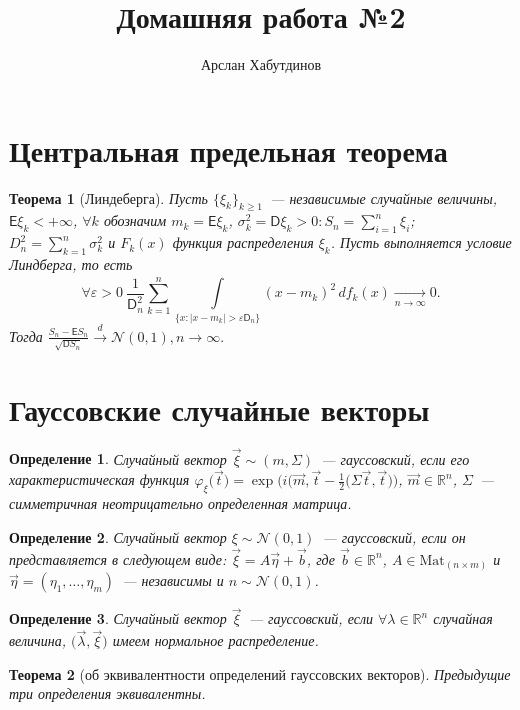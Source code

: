 \documentclass[11pt]{article}
\title{Домашняя работа №2}
\author{Арслан Хабутдинов}
\date{}
\newtheorem{thm}{Теорема}[section]
\newtheorem{dfn}{Определение}
\begin{document}
    \maketitle
    \section{Центральная предельная теорема}
    \begin{thm}[Линдеберга]
        Пусть $\{\xi_k\}_{k \geq 1}$~--- независимые случайные величины, $\mathsf{E}\xi_k < +\infty$, $\forall k$ обозначим $m_k = \mathsf{E}\xi_k$, $\sigma_k^2 = \mathsf{D}\xi_k > 0:S_n = \sum\limits_{i = 1}^n\xi_i$; $D_n^2 = \sum\limits_{k = 1}^n\sigma_k^2$ и $F_k(x)$ функция распределения $\xi_k$. Пусть выполняется условие Линдберга, то есть 
        $$
        \forall\varepsilon > 0~\frac{1}{\mathsf{D}_n^2} \sum\limits_{k = 1}^n \int\limits_{\{x:|x - m_k| > \varepsilon \mathsf{D}_n\}}^{} (x - m_k)^2  \,d f_k(x) \xrightarrow[n\rightarrow\infty]{}0.
        $$
        Тогда $\frac{S_n - \mathsf{E}S_n}{\sqrt{\mathsf{D}S_n}} \xrightarrow{d} \mathcal{N}(0,1), n \rightarrow \infty.$
    \end{thm}

    \section{Гауссовские случайные векторы}
    \begin{dfn}
        Случайный вектор $\vec \xi \sim (m, \Sigma)$~--- гауссовский, если его характеристическая функция $\varphi_\xi\bigl(\vec t\bigr) = \exp{\bigl(i\bigl(\vec m, \vec t} - \frac{1}{2}\bigl(\Sigma \vec t, \vec t\bigr)\bigr)$, $\vec m \in \mathbb{R}^n$, $\Sigma$~--- симметричная неотрицательно определенная  матрица.
    \end{dfn}
    \begin{dfn}
        Случайный вектор $\xi \sim \mathcal{N}(0,1)$~--- гауссовский, если он представляется в следующем виде: $\vec \xi = A\vec \eta + \vec b$, где  $\vec b \in \mathbb{R}^n$, $A \in \text{Mat}_{(n \times m)}$ и $\vec \eta = (\eta_1, \dots, \eta_m)$~--- независимы и $n \sim \mathcal{N}(0,1)$.
    \end{dfn}
    \begin{dfn}
        Случайный вектор $\vec \xi$~--- гауссовский, если  $\forall \lambda \in \mathbb{R}^n$ случайная величина, $\bigl(\vec\lambda, \vec\xi\bigr)$ имеем нормальное распределение.
    \end{dfn}
    \begin{thm}[об эквивалентности определений гауссовских векторов]
        Предыдущие три определения эквивалентны.
    \end{thm}
\end{document}
